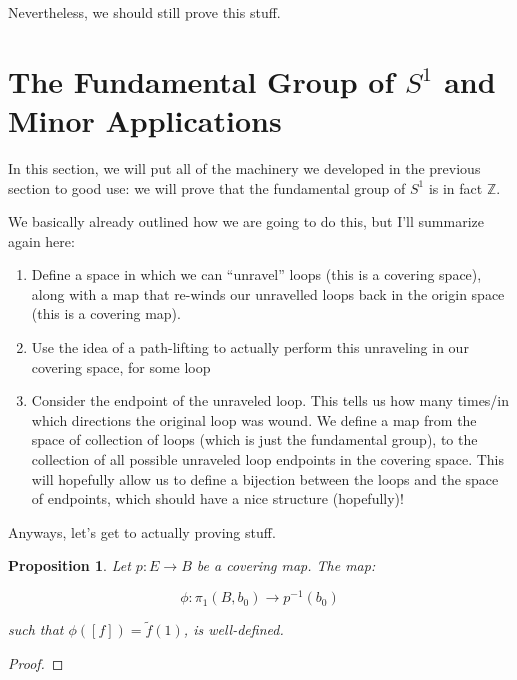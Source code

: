 \documentclass[10pt, oneside]{amsart}
\newtheorem{prop}{Proposition}
\begin{document}
    Nevertheless, we should still prove this stuff.
    \newline

    

    \section{The Fundamental Group of $S^1$ and Minor Applications}

    In this section, we will put all of the machinery we developed in the previous section to good use: we will prove that the fundamental group of $S^1$ is in fact $\mathbb{Z}$.
    \newline

    We basically already outlined how we are going to do this, but I'll summarize again here:

    \begin{enumerate}
    \item Define a space in which we can ``unravel'' loops (this is a covering space), along with a map that re-winds our unravelled loops back in the origin space (this is a covering map).
    \item Use the idea of a path-lifting to actually perform this unraveling in our covering space, for some loop
    \item Consider the endpoint of the unraveled loop. This tells us how many times/in which directions the original loop was wound. We define a map from the space of collection
      of loops (which is just the fundamental group), to the collection of all possible unraveled loop endpoints in the covering space. This will hopefully allow us to define a bijection between
      the loops and the space of endpoints, which should have a nice structure (hopefully)!
    \end{enumerate}

    Anyways, let's get to actually proving stuff.

    \begin{prop}
      Let $p : E \rightarrow B$ be a covering map. The map:

      $$\phi : \pi_1(B, b_0) \rightarrow p^{-1}(b_0)$$

      such that $\phi([f]) = \tilde{f}(1)$, is well-defined.
    \end{prop}

    \begin{proof}

    \end{proof}
\end{document}
